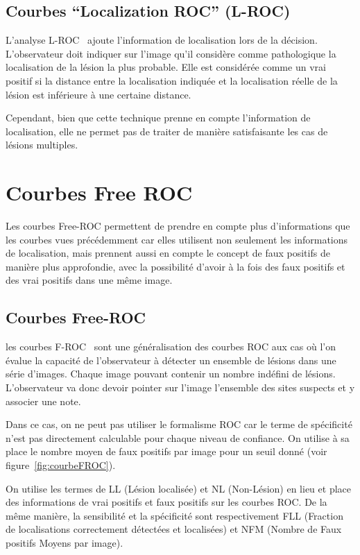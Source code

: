 \subsection{Courbes ``Localization ROC'' (L-ROC)}

L'analyse L-ROC~\cite{farquhar1999roc} ajoute l'information de localisation lors de la décision. L'observateur doit indiquer sur l'image qu'il considère comme pathologique la localisation de la lésion la plus probable. Elle est considérée comme un vrai positif si la distance entre la localisation indiquée et la localisation réelle de la lésion est inférieure à une certaine distance.

Cependant, bien que cette technique prenne en compte l'information de localisation, elle ne permet pas de traiter de manière satisfaisante les cas de lésions multiples.


\section{Courbes Free ROC}	

Les courbes Free-ROC permettent de prendre en compte plus d'informations que les courbes vues précédemment car elles utilisent non seulement les informations de localisation, mais prennent aussi en compte le concept de faux positifs de manière plus approfondie, avec la possibilité d'avoir à la fois des faux positifs et des vrai positifs dans une même image.



\subsection{Courbes Free-ROC}
\label{lab:FROC}

les courbes F-ROC~\cite{bunch1978free} sont une généralisation des courbes ROC aux cas où l'on évalue la capacité de l'observateur à détecter un ensemble de lésions dans une série d'images. Chaque image pouvant contenir un nombre indéfini de lésions. L'observateur va donc devoir pointer sur l'image l'ensemble des sites suspects et y associer une note.

Dans ce cas, on ne peut pas utiliser le formalisme ROC car le terme de spécificité n'est pas directement calculable pour chaque niveau de confiance. On utilise à sa place le nombre moyen de faux positifs par image pour un seuil donné (voir figure~\ref{fig:courbeFROC}).

On utilise les termes de LL (Lésion localisée) et NL (Non-Lésion) en lieu et place des informations de vrai positifs et faux positifs sur les courbes ROC. De la même manière, la sensibilité et la spécificité sont respectivement FLL (Fraction de localisations correctement détectées et localisées) et NFM (Nombre de Faux positifs Moyens par image).

